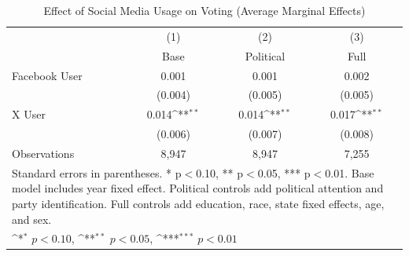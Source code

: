 \begin{table}[htbp]\centering
\def\sym#1{\ifmmode^{#1}\else\(^{#1}\)\fi}
\caption{Effect of Social Media Usage on Voting (Average Marginal Effects)}
\begin{tabular}{l*{3}{c}}
\toprule
            &\multicolumn{1}{c}{(1)}&\multicolumn{1}{c}{(2)}&\multicolumn{1}{c}{(3)}\\
            &\multicolumn{1}{c}{Base}&\multicolumn{1}{c}{Political}&\multicolumn{1}{c}{Full}\\
\midrule
Facebook User&       0.001         &       0.001         &       0.002         \\
            &     (0.004)         &     (0.005)         &     (0.005)         \\
\addlinespace
X User      &       0.014\sym{**} &       0.014\sym{**} &       0.017\sym{**} \\
            &     (0.006)         &     (0.007)         &     (0.008)         \\
\midrule
Observations&       8,947         &       8,947         &       7,255         \\
\bottomrule
\multicolumn{4}{l}{\footnotesize Standard errors in parentheses. * p$<$0.10, ** p$<$0.05, *** p$<$0.01. Base model includes year fixed effect. Political controls add political attention and party identification. Full controls add education, race, state fixed effects, age, and sex.}\\
\multicolumn{4}{l}{\footnotesize \sym{*} \(p<0.10\), \sym{**} \(p<0.05\), \sym{***} \(p<0.01\)}\\
\end{tabular}
\end{table}
